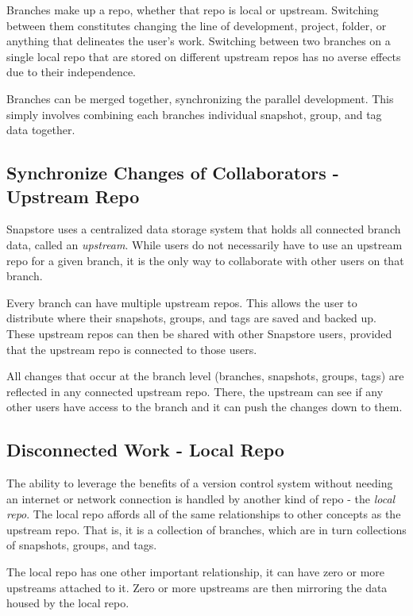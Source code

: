 Branches make up a repo, whether that repo is local or upstream. Switching between them constitutes changing the line of development, project, folder, or anything that delineates the user's work. Switching between two branches on a single local repo that are stored on different upstream repos has no averse effects due to their independence.

Branches can be merged together, synchronizing the parallel development. This simply involves combining each branches individual snapshot, group, and tag data together.

\subsection{Synchronize Changes of Collaborators - Upstream Repo}

Snapstore uses a centralized data storage system that holds all connected branch data, called an \textit{upstream}. While users do not necessarily have to use an upstream repo for a given branch, it is the only way to collaborate with other users on that branch.

Every branch can have multiple upstream repos. This allows the user to distribute where their snapshots, groups, and tags are saved and backed up. These upstream repos can then be shared with other Snapstore users, provided that the upstream repo is connected to those users. 

All changes that occur at the branch level (branches, snapshots, groups, tags) are reflected in any connected upstream repo. There, the upstream can see if any other users have access to the branch and it can push the changes down to them.

\subsection{Disconnected Work - Local Repo}

The ability to leverage the benefits of a version control system without needing an internet or network connection is handled by another kind of repo - the \textit{local repo}. The local repo affords all of the same relationships to other concepts as the upstream repo. That is, it is a collection of branches, which are in turn collections of snapshots, groups, and tags.

The local repo has one other important relationship, it can have zero or more upstreams attached to it. Zero or more upstreams are then mirroring the data housed by the local repo.


